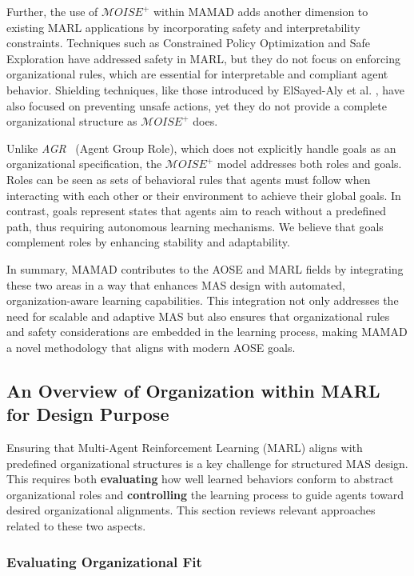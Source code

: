 \documentclass[pdflatex,sn-mathphys-num]{sn-jnl}%
\theoremstyle{thmstyleone}%
\theoremstyle{thmstyletwo}%
\theoremstyle{thmstylethree}%
\begin{document}
Further, the use of $\mathcal{M}OISE^+$ within MAMAD adds another dimension to existing MARL applications by incorporating safety and interpretability constraints. Techniques such as Constrained Policy Optimization \cite{zhao2024} and Safe Exploration \cite{melcer2024} have addressed safety in MARL, but they do not focus on enforcing organizational rules, which are essential for interpretable and compliant agent behavior. Shielding techniques, like those introduced by ElSayed-Aly et al. \cite{elsayed2021}, have also focused on preventing unsafe actions, yet they do not provide a complete organizational structure as $\mathcal{M}OISE^+$ does.

Unlike \textit{AGR}~\cite{ferber2003} (Agent Group Role), which does not explicitly handle goals as an organizational specification, the $\mathcal{M}OISE^+$ model addresses both roles and goals. Roles can be seen as sets of behavioral rules that agents must follow when interacting with each other or their environment to achieve their global goals. In contrast, goals represent states that agents aim to reach without a predefined path, thus requiring autonomous learning mechanisms. We believe that goals complement roles by enhancing stability and adaptability.

In summary, MAMAD contributes to the AOSE and MARL fields by integrating these two areas in a way that enhances MAS design with automated, organization-aware learning capabilities. This integration not only addresses the need for scalable and adaptive MAS but also ensures that organizational rules and safety considerations are embedded in the learning process, making MAMAD a novel methodology that aligns with modern AOSE goals.

\subsection{An Overview of Organization within MARL for Design Purpose}

Ensuring that Multi-Agent Reinforcement Learning (MARL) aligns with predefined organizational structures is a key challenge for structured MAS design. This requires both \textbf{evaluating} how well learned behaviors conform to abstract organizational roles and \textbf{controlling} the learning process to guide agents toward desired organizational alignments. This section reviews relevant approaches related to these two aspects.

\subsubsection{Evaluating Organizational Fit}
\end{document}
